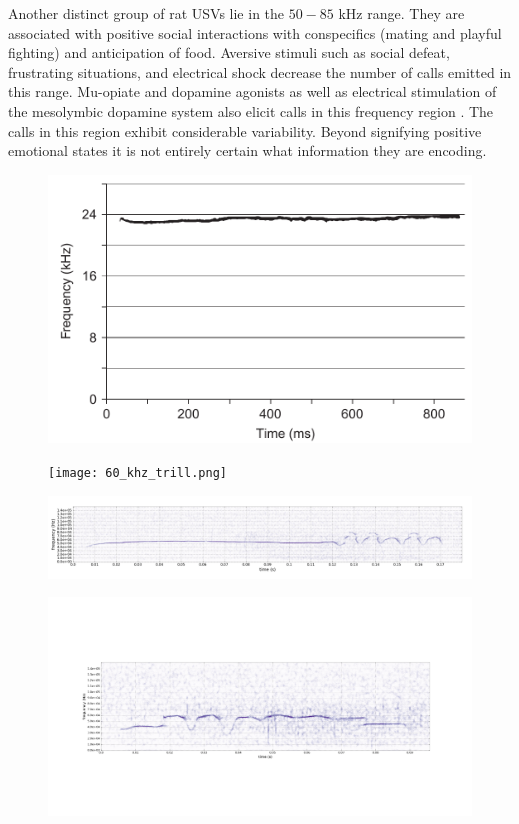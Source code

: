 \documentclass[12pt, letter]{report}
\begin{document}
Another distinct group of rat USVs lie in the $50-85$ kHz range. They are associated with positive social interactions with conspecifics (mating and playful fighting) and anticipation of food. Aversive stimuli such as social defeat, frustrating situations, and electrical shock decrease the number of calls emitted in this range. Mu-opiate and dopamine agonists as well as electrical stimulation of the mesolymbic dopamine system also elicit calls in this frequency region  \cite{Burgdorf2010}. The calls in this region exhibit considerable variability. Beyond signifying positive emotional states it is not entirely certain what information they are encoding. 
\begin{figure}
\centering
\includegraphics[width=0.5\linewidth]{22_khz.png}
\label{fig:22_khz}
\end{figure}
\begin{figure}
\centering
\texttt{[image: 60\_khz\_trill.png]}
\end{figure}
\begin{figure}
\centering
\includegraphics[width=\linewidth]{flat_to_trill.png}
\end{figure}
\begin{figure}
\centering
\includegraphics[width=\linewidth]{flat_to_trill_to_flat.png}
\end{figure}
\end{document}
